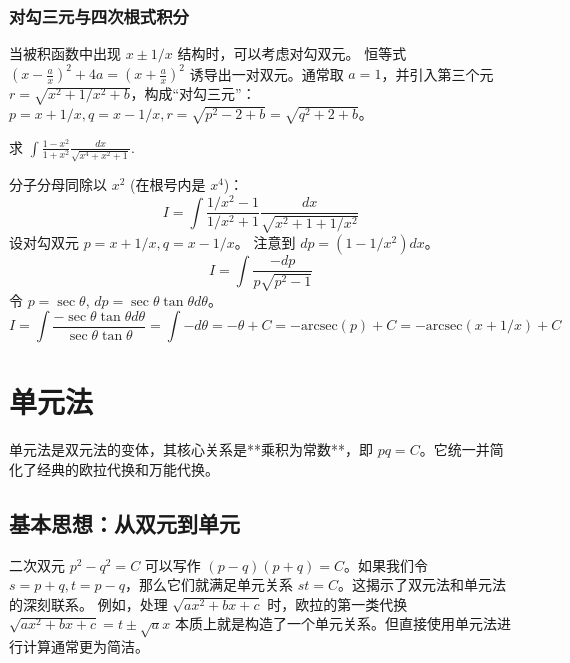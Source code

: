 \documentclass[lang=cn,newtx,10pt,scheme=chinese]{elegantbook}
\begin{document}
\subsection{对勾三元与四次根式积分}
当被积函数中出现 $x \pm 1/x$ 结构时，可以考虑对勾双元。
恒等式 $(x-\frac{a}{x})^{2}+4a=(x+\frac{a}{x})^{2}$ 诱导出一对双元。通常取 $a=1$，并引入第三个元 $r=\sqrt{x^2+1/x^2+b}$，构成“对勾三元”：
$p=x+1/x, q=x-1/x, r=\sqrt{p^2-2+b} = \sqrt{q^2+2+b}$。
\begin{problem}
求 $\int\frac{1-x^{2}}{1+x^{2}}\frac{dx}{\sqrt{x^{4}+x^{2}+1}}.$
\end{problem}
\begin{solution}
分子分母同除以 $x^2$ (在根号内是 $x^4$)：
\begin{equation*}
    I = \int \frac{1/x^2-1}{1/x^2+1} \frac{dx}{\sqrt{x^2+1+1/x^2}}
\end{equation*}
设对勾双元 $p=x+1/x, q=x-1/x$。
注意到 $dp = (1-1/x^2)dx$。
\begin{equation*}
    I = \int \frac{-dp}{p\sqrt{p^2-1}}
\end{equation*}
令 $p=\sec\theta$, $dp=\sec\theta\tan\theta d\theta$。
\begin{equation*}
    I = \int \frac{-\sec\theta\tan\theta d\theta}{\sec\theta \tan\theta} = \int -d\theta = -\theta+C = -\text{arcsec}(p)+C = -\text{arcsec}(x+1/x)+C
\end{equation*}
\end{solution}

\chapter{单元法}
单元法是双元法的变体，其核心关系是**乘积为常数**，即 $pq=C$。它统一并简化了经典的欧拉代换和万能代换。

\section{基本思想：从双元到单元}
二次双元 $p^2-q^2=C$ 可以写作 $(p-q)(p+q)=C$。如果我们令 $s=p+q, t=p-q$，那么它们就满足单元关系 $st=C$。这揭示了双元法和单元法的深刻联系。
例如，处理 $\sqrt{ax^2+bx+c}$ 时，欧拉的第一类代换 $\sqrt{ax^2+bx+c} = t \pm \sqrt{a}x$ 本质上就是构造了一个单元关系。但直接使用单元法进行计算通常更为简洁。
\end{document}
